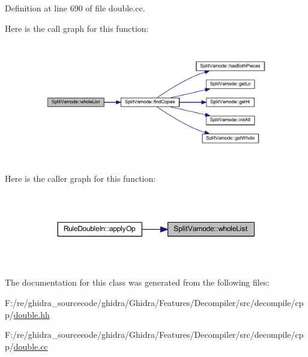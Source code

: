Definition at line 690 of file double.\+cc.

Here is the call graph for this function\+:
\nopagebreak
\begin{figure}[H]
\begin{center}
\leavevmode
\includegraphics[width=350pt]{class_split_varnode_a0d560dff52dab6123bc6b3d996ad2a29_cgraph}
\end{center}
\end{figure}
Here is the caller graph for this function\+:
\nopagebreak
\begin{figure}[H]
\begin{center}
\leavevmode
\includegraphics[width=350pt]{class_split_varnode_a0d560dff52dab6123bc6b3d996ad2a29_icgraph}
\end{center}
\end{figure}


The documentation for this class was generated from the following files\+:\begin{DoxyCompactItemize}
\item 
F\+:/re/ghidra\+\_\+sourcecode/ghidra/\+Ghidra/\+Features/\+Decompiler/src/decompile/cpp/\mbox{\hyperlink{double_8hh}{double.\+hh}}\item 
F\+:/re/ghidra\+\_\+sourcecode/ghidra/\+Ghidra/\+Features/\+Decompiler/src/decompile/cpp/\mbox{\hyperlink{double_8cc}{double.\+cc}}\end{DoxyCompactItemize}
